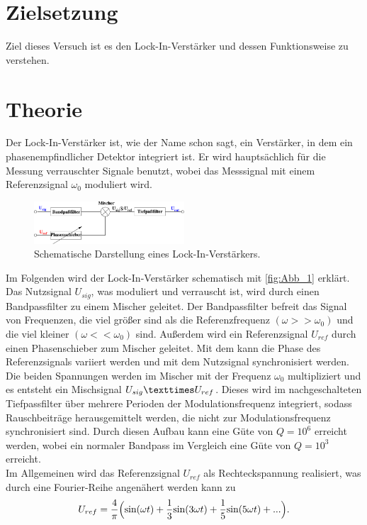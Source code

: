 \section{Zielsetzung}
\label{sec:Zielsetzung}
Ziel dieses Versuch ist es den Lock-In-Verstärker und dessen Funktionsweise zu verstehen.

\section{Theorie}
\label{sec:Theorie}
 Der Lock-In-Verstärker ist, wie der Name schon sagt, ein Verstärker, in dem ein phasenempfindlicher Detektor integriert ist.
 Er wird hauptsächlich für die Messung verrauschter Signale benutzt, wobei das Messsignal mit einem Referenzsignal $\omega_0$ moduliert wird.
 \begin{figure}[H]
    \centering
    \includegraphics[width=0.5\textwidth]{build/Abb_1.pdf}
    \caption {Schematische Darstellung eines Lock-In-Verstärkers.\cite[1]{V303}}
    \label{fig:Abb_1}
\end{figure}
Im Folgenden wird der Lock-In-Verstärker schematisch mit \autoref{fig:Abb_1} erklärt.
Das Nutzsignal $U_{sig}$, was moduliert und verrauscht ist, wird durch einen Bandpassfilter zu einem Mischer geleitet.
Der Bandpassfilter befreit das Signal von Frequenzen, die viel größer sind als die Referenzfrequenz $(\omega >> \omega_0)$ und die viel kleiner $(\omega << \omega_0)$ sind.
Außerdem wird ein Referenzsignal $U_{ref}$ durch einen Phasenschieber zum Mischer geleitet.
Mit dem kann die Phase des Referenzsignals variiert werden und mit dem Nutzsignal synchronisiert werden.
Die beiden Spannungen werden im Mischer mit der Frequenz $\omega_0$ multipliziert und es entsteht ein Mischsignal $U_{sig} \texttimes U_{ref}$.
Dieses wird im nachgeschalteten Tiefpassfilter über mehrere Perioden der Modulationsfrequenz integriert, sodass Rauschbeiträge herausgemittelt werden, die nicht zur Modulationsfrequenz synchronisiert sind.
Durch diesen Aufbau kann eine Güte von $Q = 10^6$ erreicht werden, wobei ein normaler Bandpass im Vergleich eine Güte von $Q=10^3$ erreicht.\\
Im Allgemeinen wird das Referenzsignal $U_{ref}$ als Rechteckspannung realisiert, was durch eine Fourier-Reihe angenähert werden kann zu
\begin{equation}
    U_{ref} =\frac{4}{\pi}\Bigl( \text{sin}(\omega t) + \frac{1}{3}\text{sin}(3\omega t) + \frac{1}{5}\text{sin}(5\omega t) + ... \Bigr).
    \label{eqn:Referenzsignal}
\end{equation}
